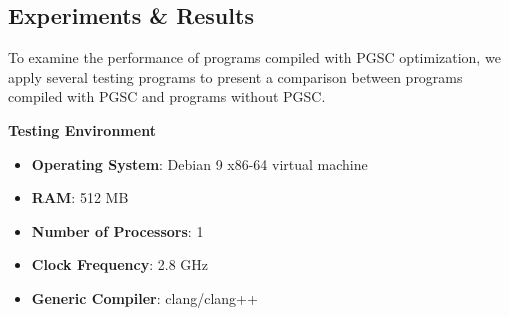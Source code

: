 \documentclass[a0,portrait]{a0poster}
\begin{document}
\begin{multicols}{2}
\section*{Experiments \& Results}

To examine the performance of programs compiled with PGSC optimization, we apply several testing programs to present a comparison between programs compiled with PGSC and programs without PGSC.

\vspace{1cm}
\textbf{Testing Environment}

\begin{itemize}
	\item \textbf{Operating System}: Debian 9 x86-64 virtual machine 
	\item \textbf{RAM}: 512 MB
	\item \textbf{Number of Processors}: 1
	\item \textbf{Clock Frequency}: 2.8 GHz
	\item \textbf{Generic Compiler}: clang/clang++
\end{itemize}

\vspace{1cm}


\end{multicols}
\end{document}
